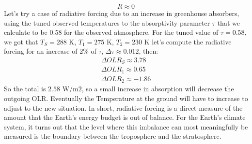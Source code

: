 $$R\approx0$$
Let’s try a case of radiative forcing due to an increase in greenhouse absorbers, using the tuned observed temperatures to the absorptivity parameter $\tau$ that we calculate to be 0.58 for the observed atmosphere. For the tuned value of $\tau=0.58$, we got that $T_S=288$ K, $T_1=275$ K, $T_2=230$ K let's compute the radiative forcing for an increase of 2\% of $\tau$, $\Delta \tau\approx 0.012$, then:
\begin{align*}
	\Delta OLR_S\approx 3.78 \\
	\Delta OLR_1\approx 0.65 \\
	\Delta OLR_2\approx-1.86
\end{align*}
So the total is $2.58$ W/m$2$, so a small increase in absorption will decrease the outgoing OLR. Eventually the Temperature at the ground will have to increase to adjust to the new situation. In short, radiative forcing is a direct measure of the amount that the Earth’s energy budget is out of balance. For the Earth’s climate system, it turns out that the level where this imbalance can most meaningfully be measured is the boundary between the troposphere and the stratosphere.


